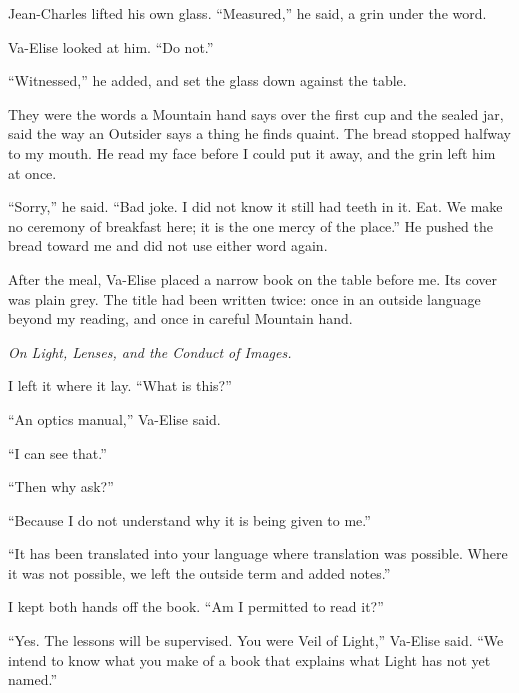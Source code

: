 Jean-Charles lifted his own glass. ``Measured,'' he said, a grin under the word.\par

Va-Elise looked at him. ``Do not.''\par

``Witnessed,'' he added, and set the glass down against the table.\par

They were the words a Mountain hand says over the first cup and the sealed jar, said the way an Outsider says a thing he finds quaint. The bread stopped halfway to my mouth. He read my face before I could put it away, and the grin left him at once.\par

``Sorry,'' he said. ``Bad joke. I did not know it still had teeth in it. Eat. We make no ceremony of breakfast here; it is the one mercy of the place.'' He pushed the bread toward me and did not use either word again.\par

After the meal, Va-Elise placed a narrow book on the table before me. Its cover was plain grey. The title had been written twice: once in an outside language beyond my reading, and once in careful Mountain hand.\par

\textit{On Light, Lenses, and the Conduct of Images.}\par

I left it where it lay. ``What is this?''\par

``An optics manual,'' Va-Elise said.\par

``I can see that.''\par

``Then why ask?''\par

``Because I do not understand why it is being given to me.''\par

``It has been translated into your language where translation was possible. Where it was not possible, we left the outside term and added notes.''\par

I kept both hands off the book. ``Am I permitted to read it?''\par

``Yes. The lessons will be supervised. You were Veil of Light,'' Va-Elise said. ``We intend to know what you make of a book that explains what Light has not yet named.''\par


